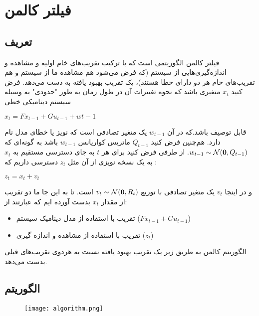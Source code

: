 \documentclass{scribe-cgenomics}
\begin{document}
\section{فیلتر کالمن}
\subsection{تعریف}
فیلتر کالمن الگوریتمی است که با ترکیب تقریب‌های خام اولیه و مشاهده و اندازه‌گیری‌هایی از سیستم (که فرض می‌شود هم مشاهده ما از سیستم و هم تقریب‌های خام هر دو دارای خطا هستند)، یک تقریب بهبود یافته به دست می‌دهد. فرض کنید 
$x_t$
 متغیری باشد  که نحوه تغییرات آن در طول زمان به طور "حدودی" به وسیله سیستم دینامیکی خطی
\begin{center}
$
x_t=Fx_{t-1}+Gu_{t-1}+w{t-1}                                                                                                                      
$
\end{center}

قابل توصیف باشد.که در آن
$w_{t-1}$
یک متغیر تصادفی است که نویز یا خطای مدل نام دارد.
هم‌چنین فرض کنید
$Q_{t-1}$
ماتریس کواریانس
$w_{t-1}$
باشد به گونه‌ای که
$w_{t-1}\sim \mathcal{N}(\bold{0}, Q_{t-1})$.
از طرفی فرض کنید برای هر 
$t$
به جای دسترسی مستقیم به
$x_t$
به یک نسخه نویزی از آن مثل
$z_t$
 دسترسی داریم که :
\begin{center}
$
z_t = x_t + v_t
$
\end{center}

و در اینجا
$v_t$
یک متغیر تصادفی با توزیع 
$v_{t}\sim \mathcal{N}(\bold{0}, R_{t})$ 
است.
تا به این جا ما دو تقریب از مقدار 
$x_t$
بدست آورده ایم که عبارتند از:

\begin{itemize}
\item{
تقریب با استفاده از مدل دینامیک سیستم
($Fx_{t-1}+Gu_{t-1}$)
}
\item{
تقریب با استفاده از مشاهده و اندازه گیری
($z_t$)
}
\end{itemize}

الگوریتم کالمن به طریق زیر یک تقریب بهبود یافته نسبت به هردوی تقریب‌های قبلی بدست می‌دهد.



\subsection{الگوریتم}

\begin{figure}
\texttt{[image: algorithm.png]}
\centering
\end{figure}
\end{document}
